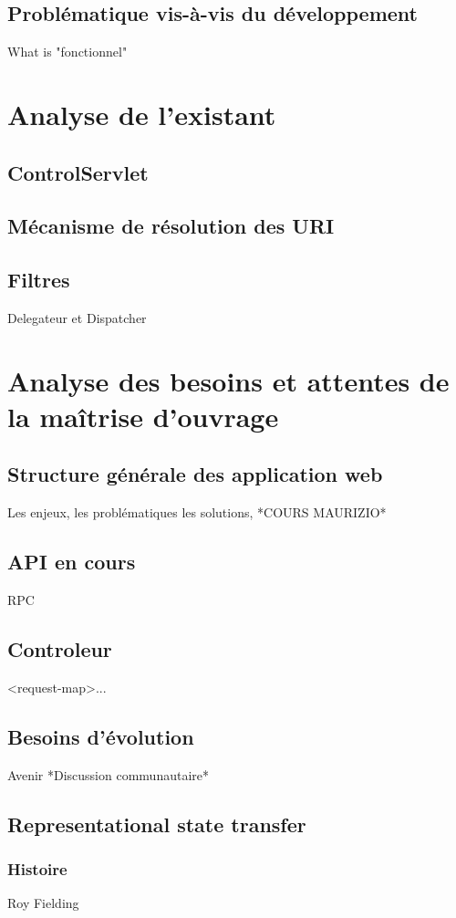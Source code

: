 \subsection{Problématique vis-à-vis du développement}
What is "fonctionnel"

\section{Analyse de l'existant}
\subsection{ControlServlet}
\subsection{Mécanisme de résolution des URI}
\subsection{Filtres}
Delegateur et Dispatcher


\section{Analyse des besoins et attentes de la maîtrise d'ouvrage}
\subsection{Structure générale des application web}
Les enjeux, les problématiques les solutions, *COURS MAURIZIO*
\subsection{API en cours}
RPC
\subsection{Controleur}
<request-map>...
\subsection{Besoins d'évolution}
Avenir
*Discussion communautaire*
\subsection{Representational state transfer}
\subsubsection{Histoire}
Roy Fielding
